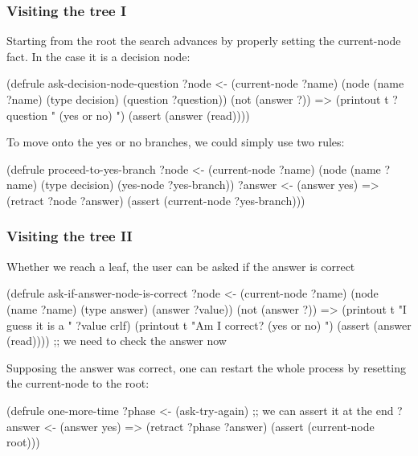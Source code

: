 \documentclass[xcolor={usenames,dvipsnames,svgnames}, compress]{beamer}
\begin{document}
\begin{frame}[fragile]
  \frametitle{Visiting the tree I}
  Starting from the root the search advances by properly setting the
  \textsf{current-node} fact. In the case it is a decision node:
  \begin{clips-code}[numbers=none]
    (defrule ask-decision-node-question
        ?node <- (current-node ?name) (node (name ?name) (type decision)
        (question ?question))
        (not (answer ?))
        =>
        (printout t ?question " (yes or no) ")
        (assert (answer (read))))
  \end{clips-code}

  To move onto the yes or no branches, we could simply use two rules:
  \begin{clips-code}[numbers=none]
    (defrule proceed-to-yes-branch
        ?node <- (current-node ?name)
        (node (name ?name) (type decision) (yes-node ?yes-branch))
        ?answer <- (answer yes)
        =>
        (retract ?node ?answer)
        (assert (current-node ?yes-branch)))
  \end{clips-code}    
\end{frame}

\begin{frame}[fragile]
  \frametitle{Visiting the tree II}
  Whether we reach a leaf, the user can be asked if the answer is correct
  \begin{clips-code}[numbers=none]
    (defrule ask-if-answer-node-is-correct
        ?node <- (current-node ?name)
        (node (name ?name) (type answer) (answer ?value))
        (not (answer ?))
        =>
        (printout t "I guess it is a " ?value crlf)
        (printout t "Am I correct? (yes or no) ")
        (assert (answer (read)))) ;; we need to check the answer now
  \end{clips-code}

  Supposing the answer was correct, one can restart the whole process
  by resetting the \textsf{current-node} to the root:
  \begin{clips-code}[numbers=none]
    (defrule one-more-time
        ?phase <- (ask-try-again) ;; we can assert it at the end
        ?answer <- (answer yes)
        =>
        (retract ?phase ?answer)
        (assert (current-node root)))
  \end{clips-code}
      
\end{frame}
\end{document}
